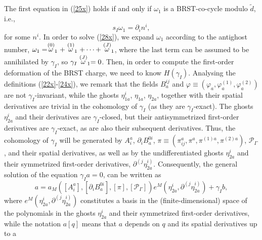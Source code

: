 \documentclass[a4paper,12pt]{article}
\begin{document}
The first equation in (\ref{25x}) holds if and only if $\omega _{1}$ is a
BRST-co-cycle modulo $\tilde{d}$, i.e., 
\begin{equation}
s_{I}\omega _{1}=\partial _{i}n^{i},  \label{28x}
\end{equation}
for some $n^{i}$. In order to solve (\ref{28x}), we expand $\omega _{1}$
according to the antighost number, $\omega _{1}=\stackrel{\left( 0\right) }{%
\omega }_{1}+\stackrel{\left( 1\right) }{\omega }_{1}+\cdots +\stackrel{%
\left( J\right) }{\omega }_{1}$, where the last term can be assumed to be
annihilated by $\gamma _{I}$, so $\gamma _{I}\stackrel{\left( J\right) }{%
\omega }_{1}=0$. Then, in order to compute the first-order deformation of
the BRST charge, we need to know $H\left( \gamma _{I}\right) $. Analysing
the definitions (\ref{22x}-\ref{24x}), we remark that the fields $B_{a}^{ij}$
and $\varphi \equiv \left( \varphi _{a},\varphi _{a}^{\left( 1\right)
},\varphi _{a}^{\left( 2\right) }\right) $ are not $\gamma _{I}$-invariant,
while the ghosts $\eta _{1a}^{i}$, $\eta _{1a}$, $\eta _{2a}$, together with
their spatial derivatives are trivial in the cohomology of $\gamma _{I}$ (as
they are $\gamma _{I}$-exact). The ghosts $\eta _{2a}^{i}$ and their
derivatives are $\gamma _{I}$-closed, but their antisymmetrized first-order
derivatives are $\gamma _{I}$-exact, as are also their subsequent
derivatives. Thus, the cohomology of $\gamma _{I}$ will be generated by $%
A_{i}^{a}$, $\partial _{i}B_{a}^{0i}$, $\pi \equiv \left( \pi _{ij}^{a},\pi
^{a},\pi ^{(1)a},\pi ^{(2)a}\right) $, $\mathcal{P}_{\Gamma }$, and their
spatial derivatives, as well as by the undifferentiated ghosts $\eta
_{2a}^{i}$ and their symmetrized first-order derivatives, $\partial ^{\left(
j\right. }\eta _{2a}^{\left. i\right) }$. Consequently, the general solution
of the equation $\gamma _{I}a=0$, can be written as 
\begin{equation}
a=a_{M}\left( \left[ A_{i}^{a}\right] ,\left[ \partial _{i}B_{a}^{0i}\right]
,\left[ \pi \right] ,\left[ \mathcal{P}_{\Gamma }\right] \right) e^{M}\left(
\eta _{2a}^{i},\partial ^{\left( j\right. }\eta _{2a}^{\left. i\right)
}\right) +\gamma _{I}b,  \label{27x}
\end{equation}
where $e^{M}\left( \eta _{2a}^{i},\partial ^{\left( j\right. }\eta
_{2a}^{\left. i\right) }\right) $ constitutes a basis in the
(finite-dimensional) space of the polynomials in the ghosts $\eta _{2a}^{i}$
and their symmetrized first-order derivatives, while the notation $a\left[
q\right] $ means that $a$ depends on $q$ and its spatial derivatives up to a
\end{document}
